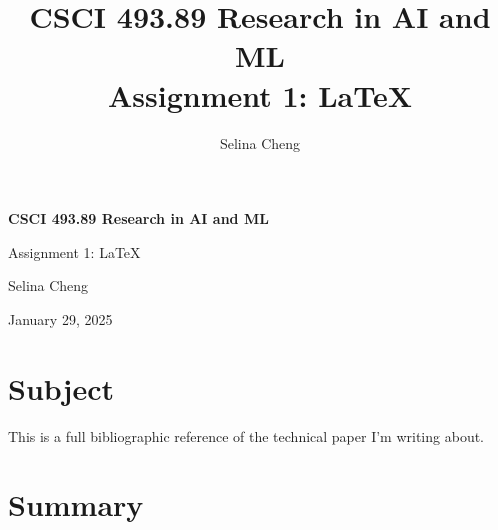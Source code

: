 \documentclass[12pt, letterpaper]{article}
\title{\textbf{CSCI 493.89 Research in AI and ML\\Assignment 1: \LaTeX{}}} %
\author{Selina Cheng} %
\affiliation{CUNY Hunter College} %
\begin{document}
\pagestyle{empty}

    



\vspace{2.5cm}





\newgeometry{} %

\textbf{CSCI 493.89 Research in AI and ML}

Assignment 1: \LaTeX{}

Selina Cheng

January 29, 2025

\section{Subject}
\label{sec:subject}


This is a full bibliographic reference of the technical paper I'm writing about.

\section{Summary}
\label{sec:summary}
\end{document}
